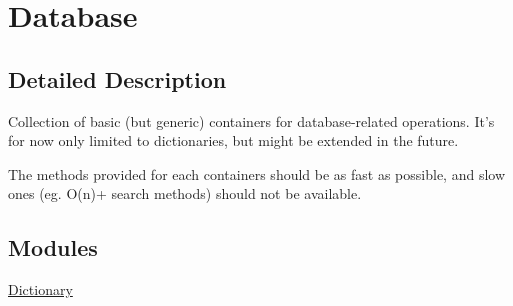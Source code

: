 \hypertarget{group__db}{
\section{Database}
\label{group__db}
}


\subsection{Detailed Description}
\begin{Desc}
\item[]Collection of basic (but generic) containers for database-related operations. It's for now only limited to dictionaries, but might be extended in the future.\end{Desc}
\begin{Desc}
\item[]The methods provided for each containers should be as fast as possible, and slow ones (eg. O(n)+ search methods) should not be available. \end{Desc}


\subsection*{Modules}
\begin{CompactItemize}
\item 
\hyperlink{group__dict}{Dictionary}
\end{CompactItemize}
